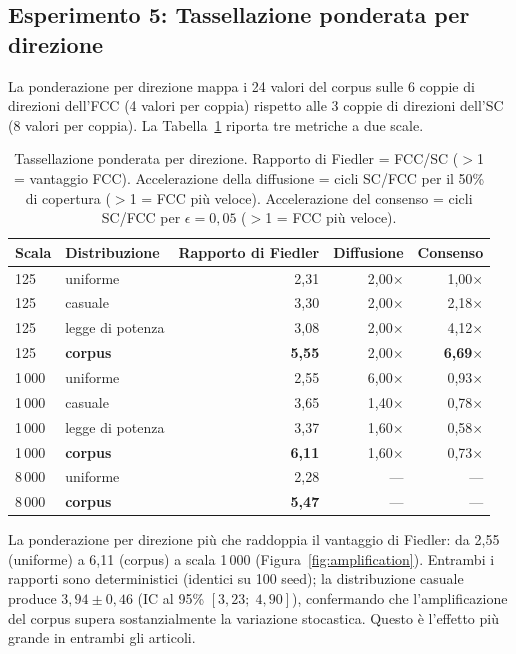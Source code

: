 \documentclass[11pt]{article}
\begin{document}
\subsection{Esperimento 5: Tassellazione ponderata per direzione}

La ponderazione per direzione mappa i 24 valori del corpus sulle 6
coppie di direzioni dell'FCC (4 valori per coppia) rispetto alle 3
coppie di direzioni dell'SC (8 valori per coppia). La
Tabella~\ref{tab:exp5} riporta tre metriche a due scale.

\begin{table}[H]
\centering
\caption{Tassellazione ponderata per direzione. Rapporto di Fiedler =
  FCC/SC ($>$1 = vantaggio FCC). Accelerazione della diffusione =
  cicli SC/FCC per il 50\% di copertura ($>$1 = FCC pi\`u veloce).
  Accelerazione del consenso = cicli SC/FCC per
  $\epsilon = 0{,}05$ ($>$1 = FCC pi\`u veloce).}
\label{tab:exp5}
\begin{tabular}{llrrr}
\toprule
Scala & Distribuzione & Rapporto di Fiedler & Diffusione & Consenso \\
\midrule
125  & uniforme    & 2,31 & 2,00$\times$ & 1,00$\times$ \\
125  & casuale     & 3,30 & 2,00$\times$ & 2,18$\times$ \\
125  & legge di potenza  & 3,08 & 2,00$\times$ & 4,12$\times$ \\
125  & \textbf{corpus} & \textbf{5,55} & 2,00$\times$ & \textbf{6,69}$\times$ \\
\midrule
1\,000  & uniforme    & 2,55 & 6,00$\times$ & 0,93$\times$ \\
1\,000  & casuale     & 3,65 & 1,40$\times$ & 0,78$\times$ \\
1\,000  & legge di potenza  & 3,37 & 1,60$\times$ & 0,58$\times$ \\
1\,000  & \textbf{corpus} & \textbf{6,11} & 1,60$\times$ & 0,73$\times$ \\
\midrule
8\,000  & uniforme    & 2,28 & --- & --- \\
8\,000  & \textbf{corpus} & \textbf{5,47} & --- & --- \\
\bottomrule
\end{tabular}
\end{table}

La ponderazione per direzione pi\`u che raddoppia il vantaggio di
Fiedler: da 2,55 (uniforme) a 6,11 (corpus) a scala 1\,000
(Figura~\ref{fig:amplification}). Entrambi i rapporti sono
deterministici (identici su 100 seed); la distribuzione casuale produce
$3{,}94 \pm 0{,}46$ (IC al 95\% $[3{,}23;\; 4{,}90]$), confermando
che l'amplificazione del corpus supera sostanzialmente la variazione
stocastica. Questo \`e l'effetto pi\`u grande in entrambi gli articoli.
\end{document}
